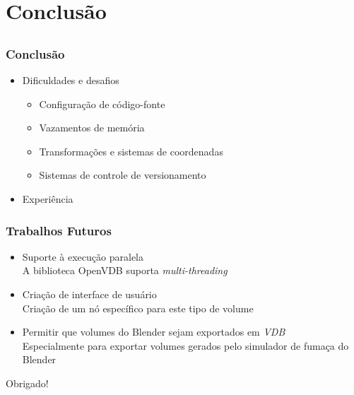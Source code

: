 \documentclass{beamer}
\begin{document}
\section{Conclusão}
\subsection{}
\frametitle{Conclusão}
\begin{frame}
\begin{itemize}
\item Dificuldades e desafios
\begin{itemize}
\item Configuração de código-fonte
\item Vazamentos de memória
\item Transformações e sistemas de coordenadas
\item Sistemas de controle de versionamento  
\end{itemize}
\item Experiência
\end{itemize}


\end{frame}
\begin{frame}

\frametitle{Trabalhos Futuros}

\begin{itemize}
\item Suporte à execução paralela \\ A biblioteca OpenVDB suporta {\it multi-threading}
\item Criação de interface de usuário \\ Criação de um nó específico para este tipo de volume
\item Permitir que volumes do Blender sejam exportados em {\it VDB} \\ Especialmente para exportar volumes gerados pelo simulador de fumaça do Blender
\end{itemize}

\end{frame}

\begin{frame}

\centerline{\Huge{Obrigado!}}
\end{frame}
\end{document}
